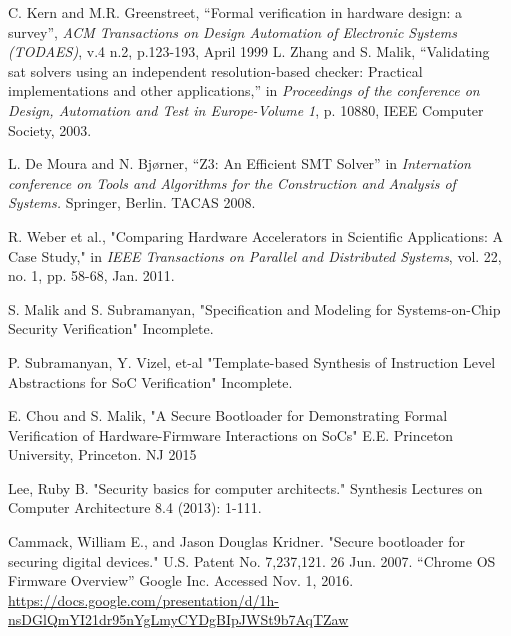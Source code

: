 \documentclass[12pt,lot, lof]{puthesis}
\begin{document}
% 
\begin{flushleft}
\begin{footnotesize}
\begin{thebibliography}{\kern\bibindent}

        C. Kern and M.R. Greenstreet, ``Formal verification in hardware design: a
        survey'', \textit{ACM Transactions on Design Automation of Electronic Systems (TODAES)}, v.4 n.2, p.123-193, April 1999 
        L. Zhang and S. Malik, ``Validating sat solvers using an independent resolution-based checker: Practical implementations and other applications,'' in \textit{Proceedings of the conference on Design, Automation and Test in Europe-Volume 1}, p. 10880, IEEE Computer Society, 2003.

        L. De Moura and N. Bjørner, ``Z3: An Efficient SMT Solver'' in \textit{Internation conference on Tools and Algorithms for the Construction and Analysis of Systems.} Springer, Berlin. TACAS 2008. 

        R. Weber et al., "Comparing Hardware Accelerators in Scientific Applications: A Case Study," in \textit{IEEE Transactions on Parallel and Distributed Systems}, vol. 22, no. 1, pp. 58-68, Jan. 2011.

        S. Malik and S. Subramanyan, "Specification and Modeling for Systems-on-Chip Security Verification" Incomplete.

        P. Subramanyan,  Y. Vizel, et-al "Template-based Synthesis of Instruction Level Abstractions for SoC Verification" Incomplete.

E. Chou and S. Malik, "A Secure Bootloader for Demonstrating Formal Verification of Hardware-Firmware Interactions on SoCs" E.E. Princeton University, Princeton. NJ 2015

        Lee, Ruby B. "Security basics for computer architects." Synthesis Lectures on Computer Architecture 8.4 (2013): 1-111.

        Cammack, William E., and Jason Douglas Kridner. "Secure bootloader for securing digital devices." U.S. Patent No. 7,237,121. 26 Jun. 2007.
        ``Chrome OS Firmware Overview'' Google Inc. Accessed Nov. 1, 2016. \url{https://docs.google.com/presentation/d/1h-nsDGlQmYI21dr95nYgLmyCYDgBIpJWSt9b7AqTZaw}        


\end{thebibliography}
\end{footnotesize}
\end{flushleft}
\end{document}
